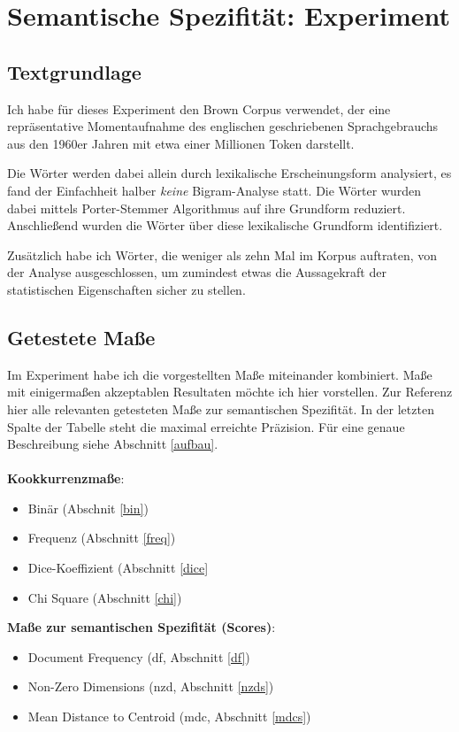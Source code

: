 \documentclass[11pt,numbers=noenddot]{scrartcl}
\begin{document}
\section{Semantische Spezifität: Experiment}

\subsection{Textgrundlage}

Ich habe für dieses Experiment den Brown Corpus \citep{francis1979brown} verwendet, der eine repräsentative Momentaufnahme des englischen geschriebenen Sprachgebrauchs aus den 1960er Jahren mit etwa einer Millionen Token darstellt.

Die Wörter werden dabei allein durch lexikalische Erscheinungsform analysiert, es fand der Einfachheit halber \emph{keine} Bigram-Analyse statt. Die Wörter wurden dabei mittels Porter-Stemmer Algorithmus \citep{Porter:1997:ASS:275537.275705} auf ihre Grundform reduziert. Anschließend wurden die Wörter über diese lexikalische Grundform identifiziert.

Zusätzlich habe ich Wörter, die weniger als zehn Mal im Korpus auftraten, von der Analyse ausgeschlossen, um zumindest etwas die Aussagekraft der statistischen Eigenschaften sicher zu stellen.

\subsection{Getestete Maße}

Im Experiment habe ich die vorgestellten Maße miteinander kombiniert. Maße mit einigermaßen akzeptablen Resultaten möchte ich hier vorstellen. Zur Referenz hier alle relevanten getesteten Maße zur semantischen Spezifität. In der letzten Spalte der Tabelle steht die maximal erreichte Präzision. Für eine genaue Beschreibung siehe Abschnitt \ref{aufbau}.
\\\\
\textbf{Kookkurrenzmaße}:
\begin{itemize}
    \item Binär (Abschnit \ref{bin})
    \item Frequenz (Abschnitt \ref{freq})
    \item Dice-Koeffizient (Abschnitt \ref{dice}
    \item Chi Square (Abschnitt \ref{chi})
\end{itemize}

\noindent\textbf{Maße zur semantischen Spezifität (Scores)}:
\begin{itemize}
    \item Document Frequency (df, Abschnitt \ref{df})
    \item Non-Zero Dimensions (nzd, Abschnitt \ref{nzds})
    \item Mean Distance to Centroid (mdc, Abschnitt \ref{mdcs})
\end{itemize}
\end{document}
